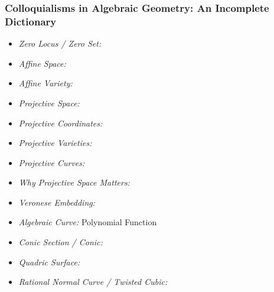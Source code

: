 \documentclass[12 pt]{article}        	%
\begin{document}
\subsubsection{Colloquialisms in Algebraic Geometry: An Incomplete Dictionary}
\begin{itemize}
    \item \textit{Zero Locus / Zero Set:}
    \item \textit{Affine Space:}
    \item \textit{Affine Variety:}
    \item \textit{Projective Space:}
    \item \textit{Projective Coordinates:}
    \item \textit{Projective Varieties:}
    \item \textit{Projective Curves:}
    \item \textit{Why Projective Space Matters:}
    \item \textit{Veronese Embedding:}
    \item \textit{Algebraic Curve:} Polynomial Function
    \item \textit{Conic Section / Conic:}
    \item \textit{Quadric Surface:}
    \item \textit{Rational Normal Curve / Twisted Cubic:}
\end{itemize}
\end{document}
